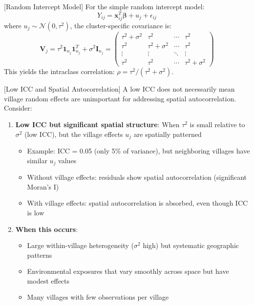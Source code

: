 \documentclass{article}
\begin{document}
[Random Intercept Model]
For the simple random intercept model:
\begin{equation}
Y_{ij} = \mathbf{x}_{ij}^T\boldsymbol{\beta} + u_j + \epsilon_{ij}
\end{equation}
where $u_j \sim \mathcal{N}(0, \tau^2)$, the cluster-specific covariance is:
\begin{equation}
\mathbf{V}_j = \tau^2\mathbf{1}_{n_j}\mathbf{1}_{n_j}^T + \sigma^2\mathbf{I}_{n_j} = \begin{pmatrix}
\tau^2 + \sigma^2 & \tau^2 & \cdots & \tau^2 \\
\tau^2 & \tau^2 + \sigma^2 & \cdots & \tau^2 \\
\vdots & \vdots & \ddots & \vdots \\
\tau^2 & \tau^2 & \cdots & \tau^2 + \sigma^2
\end{pmatrix}
\end{equation}
This yields the intraclass correlation: $\rho = \tau^2/(\tau^2 + \sigma^2)$.

[Low ICC and Spatial Autocorrelation]
A low ICC does not necessarily mean village random effects are unimportant for addressing spatial autocorrelation. Consider:

\begin{enumerate}
    \item \textbf{Low ICC but significant spatial structure}: When $\tau^2$ is small relative to $\sigma^2$ (low ICC), but the village effects $u_j$ are spatially patterned
    \begin{itemize}
        \item Example: ICC = 0.05 (only 5\% of variance), but neighboring villages have similar $u_j$ values
        \item Without village effects: residuals show spatial autocorrelation (significant Moran's I)
        \item With village effects: spatial autocorrelation is absorbed, even though ICC is low
    \end{itemize}
    
    \item \textbf{When this occurs}:
    \begin{itemize}
        \item Large within-village heterogeneity ($\sigma^2$ high) but systematic geographic patterns
        \item Environmental exposures that vary smoothly across space but have modest effects
        \item Many villages with few observations per village
    \end{itemize}
\end{enumerate}
\end{document}
